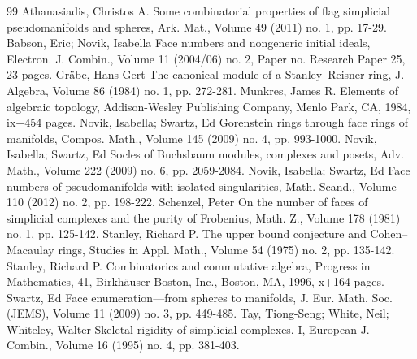 \begin{thebibliography}{99}
 Athanasiadis, Christos A. Some combinatorial properties of flag simplicial pseudomanifolds and spheres, Ark. Mat., Volume 49 (2011) no. 1, pp. 17-29.
 Babson, Eric; Novik, Isabella Face numbers and nongeneric initial ideals, Electron. J. Combin., Volume 11 (2004/06) no. 2, Paper no. Research Paper 25, 23 pages.
 Gräbe, Hans-Gert The canonical module of a Stanley–Reisner ring, J. Algebra, Volume 86 (1984) no. 1, pp. 272-281.
 Munkres, James R. Elements of algebraic topology, Addison-Wesley Publishing Company, Menlo Park, CA, 1984, ix+454 pages.
 Novik, Isabella; Swartz, Ed Gorenstein rings through face rings of manifolds, Compos. Math., Volume 145 (2009) no. 4, pp. 993-1000.
 Novik, Isabella; Swartz, Ed Socles of Buchsbaum modules, complexes and posets, Adv. Math., Volume 222 (2009) no. 6, pp. 2059-2084.
 Novik, Isabella; Swartz, Ed Face numbers of pseudomanifolds with isolated singularities, Math. Scand., Volume 110 (2012) no. 2, pp. 198-222.
 Schenzel, Peter On the number of faces of simplicial complexes and the purity of Frobenius, Math. Z., Volume 178 (1981) no. 1, pp. 125-142.
 Stanley, Richard P. The upper bound conjecture and Cohen–Macaulay rings, Studies in Appl. Math., Volume 54 (1975) no. 2, pp. 135-142.
 Stanley, Richard P. Combinatorics and commutative algebra, Progress in Mathematics, 41, Birkhäuser Boston, Inc., Boston, MA, 1996, x+164 pages.
 Swartz, Ed Face enumeration—from spheres to manifolds, J. Eur. Math. Soc. (JEMS), Volume 11 (2009) no. 3, pp. 449-485.
 Tay, Tiong-Seng; White, Neil; Whiteley, Walter Skeletal rigidity of simplicial complexes. I, European J. Combin., Volume 16 (1995) no. 4, pp. 381-403.
\end{thebibliography}
